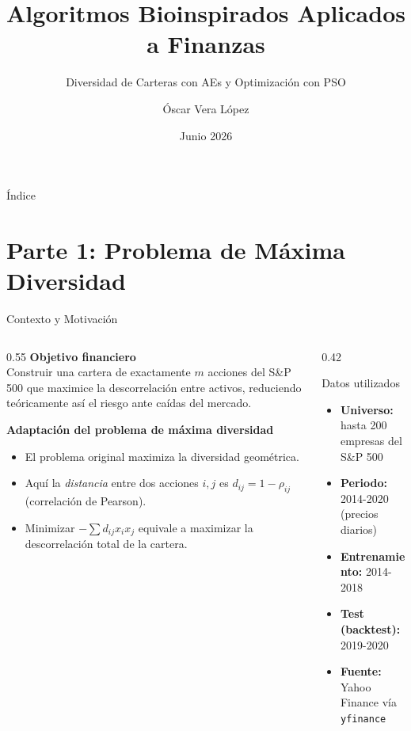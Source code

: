 \documentclass[aspectratio=169]{beamer}
\title[Optimización en Finanzas]{Algoritmos Bioinspirados Aplicados a Finanzas}
\subtitle{Diversidad de Carteras con AEs y Optimización con PSO}
\author{Óscar Vera López}
\institute{Trabajo de Computación Bioinspirada - Máster en Inteligencia Artificial}
\date{Junio 2026}
\begin{document}
\begin{frame}
  \titlepage
\end{frame}

\begin{frame}{Índice}
  \tableofcontents
\end{frame}

\section{Parte 1: Problema de Máxima Diversidad}

\begin{frame}{Contexto y Motivación}
  \begin{columns}[T]
    \begin{column}{0.55\textwidth}
      \textbf{Objetivo financiero}\\[6pt]
      Construir una cartera de exactamente $m$ acciones del S\&P 500
      que \alert{maximice la descorrelación} entre activos, reduciendo teóricamente
      así el riesgo ante caídas del mercado.

      \vspace{10pt}
      \textbf{Adaptación del problema de máxima diversidad}
      \begin{itemize}
        \item El problema original maximiza la diversidad geométrica.
        \item Aquí la \emph{distancia} entre dos acciones $i,j$ es
              $d_{ij} = 1 - \rho_{ij}$ (correlación de Pearson).
        \item Minimizar $-\sum d_{ij}x_ix_j$ equivale a maximizar la
              descorrelación total de la cartera.
      \end{itemize}
    \end{column}
    \begin{column}{0.42\textwidth}
      \begin{block}{Datos utilizados}
        \begin{itemize}
          \item \textbf{Universo:} hasta 200 empresas del S\&P 500
          \item \textbf{Periodo:} 2014-2020 (precios diarios)
          \item \textbf{Entrenamiento:} 2014-2018
          \item \textbf{Test (backtest):} 2019-2020
          \item \textbf{Fuente:} Yahoo Finance vía \texttt{yfinance}
        \end{itemize}
      \end{block}
    \end{column}
  \end{columns}
\end{frame}
\end{document}
